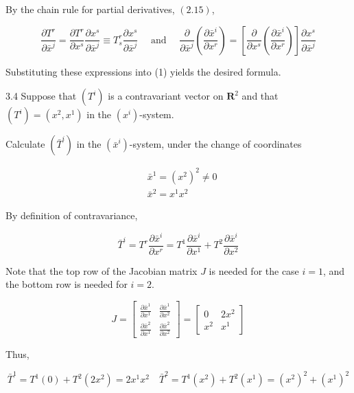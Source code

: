 \documentclass[10pt]{article}
\begin{document}
By the chain rule for partial derivatives, $(2.15)$,

$$
\frac{\partial T^{r}}{\partial \bar{x}^{j}}=\frac{\partial T^{r}}{\partial x^{s}} \frac{\partial x^{s}}{\partial \bar{x}^{j}} \equiv T_{s}^{r} \frac{\partial x^{s}}{\partial \bar{x}^{j}} \quad \text { and } \quad \frac{\partial}{\partial \bar{x}^{j}}\left(\frac{\partial \bar{x}^{i}}{\partial x^{r}}\right)=\left[\frac{\partial}{\partial x^{s}}\left(\frac{\partial \bar{x}^{i}}{\partial x^{r}}\right)\right] \frac{\partial x^{s}}{\partial \bar{x}^{j}}
$$

Substituting these expressions into (1) yields the desired formula.

3.4 Suppose that $\left(T^{i}\right)$ is a contravariant vector on $\mathbf{R}^{2}$ and that $\left(T^{i}\right)=\left(x^{2}, x^{1}\right)$ in the $\left(x^{i}\right)$-system.

Calculate $\left(\bar{T}^{i}\right)$ in the $\left(\bar{x}^{i}\right)$-system, under the change of coordinates

$$
\begin{aligned}
& \bar{x}^{1}=\left(x^{2}\right)^{2} \neq 0 \\
& \bar{x}^{2}=x^{1} x^{2}
\end{aligned}
$$

By definition of contravariance,

$$
\bar{T}^{i}=T^{r} \frac{\partial \bar{x}^{i}}{\partial x^{r}}=T^{1} \frac{\partial \bar{x}^{i}}{\partial x^{1}}+T^{2} \frac{\partial \bar{x}^{i}}{\partial x^{2}}
$$

Note that the top row of the Jacobian matrix $J$ is needed for the case $i=1$, and the bottom row is needed for $i=2$.

$$
J=\left[\begin{array}{ll}
\frac{\partial \bar{x}^{1}}{\partial x^{1}} & \frac{\partial \bar{x}^{1}}{\partial x^{2}} \\
\frac{\partial \bar{x}^{2}}{\partial x^{1}} & \frac{\partial \bar{x}^{2}}{\partial x^{2}}
\end{array}\right]=\left[\begin{array}{cc}
0 & 2 x^{2} \\
x^{2} & x^{1}
\end{array}\right]
$$

Thus,

$$
\bar{T}^{1}=T^{1}(0)+T^{2}\left(2 x^{2}\right)=2 x^{1} x^{2} \quad \bar{T}^{2}=T^{1}\left(x^{2}\right)+T^{2}\left(x^{1}\right)=\left(x^{2}\right)^{2}+\left(x^{1}\right)^{2}
$$
\end{document}
